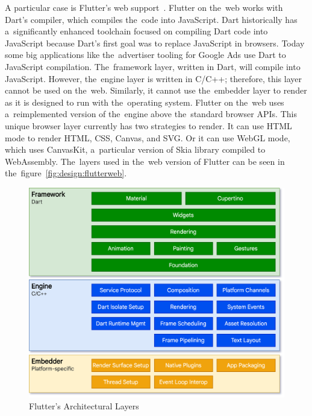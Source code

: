 A particular case is Flutter's web support~\cite{a2022_flutter_architecture}.
Flutter on the~web works with Dart's compiler, which compiles the~code into JavaScript.
Dart historically has a~significantly enhanced toolchain focused on compiling Dart code into JavaScript because Dart's first goal was to replace JavaScript in browsers.
Today some big applications like the~advertiser tooling for Google Ads use Dart to JavaScript compilation.
The~framework layer, written in Dart, will compile into JavaScript.
However, the~engine layer is written in C/C++; therefore, this layer cannot be used on the~web.
Similarly, it cannot use the~embedder layer to render as it is designed to run with the~operating system.
Flutter on the~web uses a~reimplemented version of the~engine above the~standard browser APIs.
This unique browser layer currently has two strategies to render.
\linebreak
It can use HTML mode to render HTML, CSS, Canvas, and SVG.
Or it can use WebGL mode, which uses CanvasKit, a~particular version of Skia library compiled to WebAssembly.
The~layers used in the~web version of Flutter can be seen in the~figure~\ref{fig:design:flutterweb}.

\begin{figure}
    \centering
    \includegraphics[width=1\linewidth]{assets/design/flutterlayers.png}
    \caption{Flutter's Architectural Layers~\cite{a2022_flutter_architecture}}
    \label{fig:design:flutterlayers}
\end{figure}

